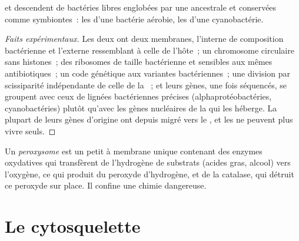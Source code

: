 \begin{proposition}\label{prop:b1:eukaryotic-cell:endosymbiosis}
 et  descendent de bactéries libres englobées par
une  ancestrale et conservées comme symbiontes~: les
 d'une bactérie aérobie, les  d'une cyanobactérie.
\end{proposition}
\begin{proof}[Faits expérimentaux]
Les deux  ont deux membranes, l'interne de composition
bactérienne et l'externe ressemblant à celle de l'hôte~; un chromosome
circulaire sans histones~; des ribosomes de taille bactérienne et
sensibles aux mêmes antibiotiques~; un code génétique aux variantes
bactériennes~; une division par scissiparité indépendante de celle de la
~; et leurs gènes, une fois séquencés, se groupent avec ceux de
lignées bactériennes précises (alphaprotéobactéries, cyanobactéries)
plutôt qu'avec les gènes nucléaires de la  qui les héberge. La
plupart de leurs gènes d'origine ont depuis migré vers le , et les
 ne peuvent plus vivre seuls.
\end{proof}

\begin{definition}[Peroxysome]\label{def:b1:eukaryotic-cell:peroxisome}
Un \emph{peroxysome} est un petit  à membrane
unique contenant des enzymes oxydatives qui transfèrent de l'hydrogène
de substrats (acides gras, alcool) vers l'oxygène, ce qui produit du
peroxyde d'hydrogène, et de la catalase, qui détruit ce peroxyde sur
place. Il confine une chimie dangereuse.
\end{definition}

\section{Le cytosquelette}

